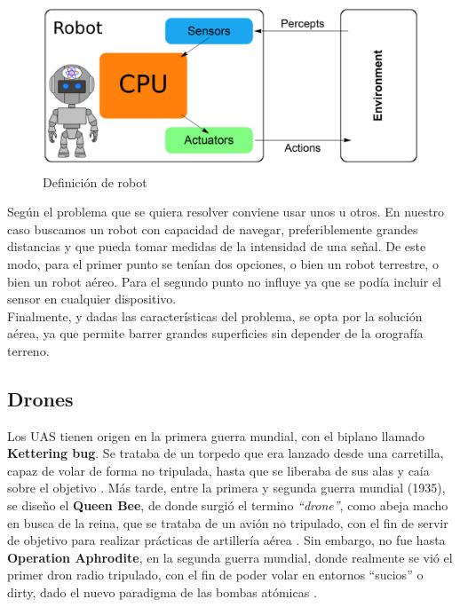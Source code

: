 \begin{figure} [H]
	\begin{center}
	\includegraphics[height=5cm]{imagenes/cap1/3_robot.png}
	\end{center}
	\caption[Definición de robot]{Definición de robot}
	\label{fig:robot_def}
\end{figure}

Según el problema que se quiera resolver conviene usar unos u otros. En nuestro caso buscamos un robot con capacidad de navegar, preferiblemente grandes distancias y que pueda tomar medidas de la intensidad de una señal. De este modo, para el primer punto se tenían dos opciones, o bien un robot terrestre, o bien un robot aéreo. Para el segundo punto no influye ya que se podía incluir el sensor en cualquier dispositivo.\\

Finalmente, y dadas las características del problema, se opta por la solución aérea, ya que permite barrer grandes superficies sin depender de la orografía terreno.

\subsection{Drones}
\label{subsec:drones}

Los \ac{UAS} tienen origen en la primera guerra mundial, con el biplano llamado \textbf{Kettering bug}. Se trataba de un torpedo que era lanzado desde una carretilla, capaz de volar de forma no tripulada, hasta que se liberaba de sus alas y caía sobre el objetivo \cite{kettering-bug}. Más tarde, entre la primera y segunda guerra mundial (1935), se diseño el \textbf{Queen Bee}, de donde surgió el termino \emph{``drone''}, como abeja macho en busca de la reina, que se trataba de un avión no tripulado, con el fin de servir de objetivo para realizar prácticas de artillería aérea \cite{queen-bee}. Sin embargo, no fue hasta \textbf{Operation Aphrodite}, en la segunda guerra mundial, donde realmente se vió el primer dron radio tripulado, con el fin de poder volar en entornos ``sucios'' o dirty, dado el nuevo paradigma de las bombas atómicas \cite{operation-aphrodite}.\\

